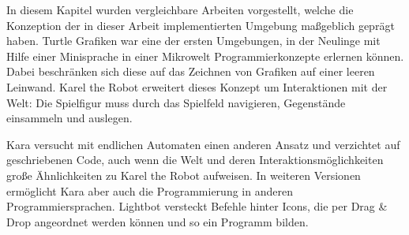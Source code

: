 In diesem Kapitel wurden vergleichbare Arbeiten vorgestellt, welche die Konzeption der in dieser Arbeit implementierten Umgebung maßgeblich geprägt haben. Turtle Grafiken war eine der ersten Umgebungen, in der Neulinge mit Hilfe einer Minisprache in einer Mikrowelt Programmierkonzepte erlernen können. Dabei beschränken sich diese auf das Zeichnen von Grafiken auf einer leeren Leinwand. Karel the Robot erweitert dieses Konzept um Interaktionen mit der Welt: Die Spielfigur muss durch das Spielfeld navigieren, Gegenstände einsammeln und auslegen.

Kara versucht mit endlichen Automaten einen anderen Ansatz und verzichtet auf geschriebenen Code, auch wenn die Welt und deren Interaktionsmöglichkeiten große Ähnlichkeiten zu Karel the Robot aufweisen. In weiteren Versionen ermöglicht Kara aber auch die Programmierung in anderen Programmiersprachen. Lightbot versteckt Befehle hinter Icons, die per Drag \& Drop angeordnet werden können und so ein Programm bilden.
